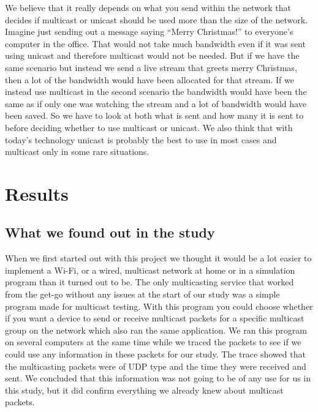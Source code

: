 \documentclass[9pt,a4paper]{acmproc}
\begin{document}
We believe that it really depends on what you send within the network that decides if multicast or unicast should be used more than the size of the network. Imagine just sending out a message saying “Merry Christmas!” to everyone's computer in the office. That would not take much bandwidth even if it was sent using unicast and therefore multicast would not be needed. But if we have the same scenario but instead we send a live stream that greets merry Christmas, then a lot of the bandwidth would have been allocated for that stream. If we instead use multicast in the second scenario the bandwidth would have been the same as if only one was watching the stream and a lot of bandwidth would have been saved. So we have to look at both what is sent and how many it is sent to before deciding whether to use multicast or unicast. We also think that with today's technology unicast is probably the best to use in most cases and multicast only in some rare situations. \cite{multExplained} \cite{whatIsMult} \cite{understandIpMult} 


\clearpage

\section{Results}

\subsection{What we found out in the study}

When we first started out with this project we thought it would be a lot easier to implement a Wi-Fi, or a wired, multicast network at home or in a simulation program than it turned out to be. The only multicasting service that worked from the get-go without any issues at the start of our study was a simple program made for multicast testing. With this program you could choose whether if you want a device to send or receive multicast packets for a specific multicast group on the network which also ran the same application. We ran this program on several computers at the same time while we traced the packets to see if we could use any information in these packets for our study. The trace showed that the multicasting packets were of UDP type and the time they were received and sent. We concluded that this information was not going to be of any use for us in this study, but it did confirm everything we already knew about multicast packets.
\end{document}
